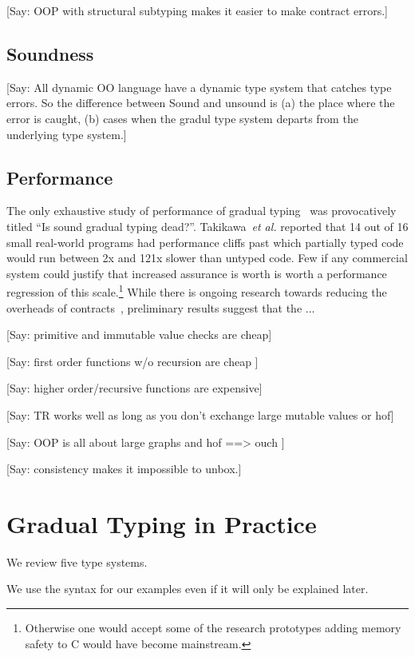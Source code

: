 \documentclass[a4paper,USenglish]{tex/lipics-v2016}
\begin{document}
[Say: OOP with structural subtyping makes it easier to make contract errors.]


\subsection{Soundness}

[Say: All dynamic OO language have a dynamic type system that catches type errors.  So the difference between Sound and unsound is (a) the place where the error is caught, (b) cases when the gradul type system departs from the underlying type system.]  

\subsection{Performance}

The only exhaustive study of performance of gradual typing~\cite{popl16} was
provocatively titled ``Is sound gradual typing dead?''.  Takikawa~\emph{et
  al.}  reported that 14 out of 16 small real-world programs had performance
cliffs past which partially typed code would run between 2x and 121x slower
than untyped code. Few if any commercial system could justify that increased
assurance is worth is worth a performance regression of this
scale.\footnote{Otherwise one would accept some of the research prototypes
  adding memory safety to C would have become mainstream.} While there is
ongoing research towards reducing the overheads of
contracts~\cite{pycket15}, preliminary results suggest that the ...


[Say: primitive and immutable value checks are cheap]

[Say: first order functions w/o recursion are cheap ]

[Say: higher order/recursive functions are expensive]

[Say: TR works well as long as you don't exchange large mutable values or hof]

[Say: OOP is all about large graphs and hof ==> ouch ]

[Say: consistency makes it impossible to unbox.]

\section{Gradual Typing in Practice}

We review five type systems.

We use the \kafka syntax for our examples even if it will only be explained later.
\end{document}
